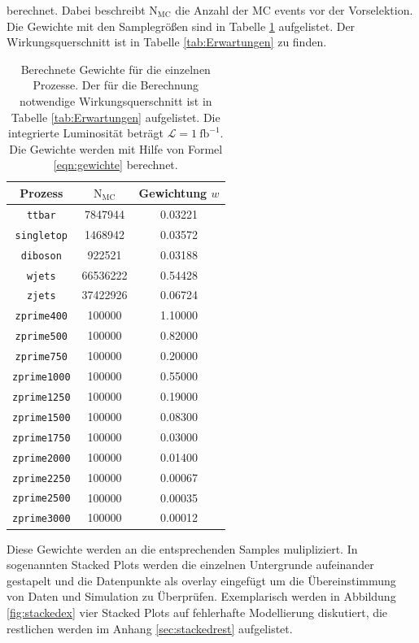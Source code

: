 berechnet. Dabei beschreibt $\text{N}_\text{MC}$ die Anzahl der MC events vor der
Vorselektion. Die Gewichte mit den Samplegrößen sind in Tabelle
\ref{tab:Gewichte} aufgelistet. Der Wirkungsquerschnitt ist in Tabelle
\ref{tab:Erwartungen} zu finden.

\begin{table}[H]
    \centering
    \caption{Berechnete Gewichte für die einzelnen Prozesse. Der für die Berechnung notwendige
    Wirkungsquerschnitt ist in Tabelle \ref{tab:Erwartungen} aufgelistet. Die integrierte
    Luminosität beträgt $\mathcal{L} = \SI{1}{\femto\barn}^{-1}$. Die Gewichte werden mit
    Hilfe von Formel \eqref{eqn:gewichte} berechnet.}
    \label{tab:Gewichte}
    \begin{tabular}{c|cc}
    \toprule
    Prozess & $\text{N}_\text{MC}$ & Gewichtung $w$ \\
    \midrule
    \texttt{ttbar}      & 7847944    & 0.03221     \\
    \texttt{singletop}  & 1468942    & 0.03572     \\
    \texttt{diboson}    & 922521     & 0.03188     \\
    \texttt{wjets}      & 66536222   & 0.54428     \\
    \texttt{zjets}      & 37422926   & 0.06724     \\
    \texttt{zprime400}  & 100000     & 1.10000     \\
    \texttt{zprime500}  & 100000     & 0.82000     \\
    \texttt{zprime750}  & 100000     & 0.20000     \\
    \texttt{zprime1000} & 100000     & 0.55000     \\
    \texttt{zprime1250} & 100000     & 0.19000     \\
    \texttt{zprime1500} & 100000     & 0.08300     \\
    \texttt{zprime1750} & 100000     & 0.03000     \\
    \texttt{zprime2000} & 100000     & 0.01400     \\
    \texttt{zprime2250} & 100000     & 0.00067     \\
    \texttt{zprime2500} & 100000     & 0.00035     \\
    \texttt{zprime3000} & 100000     & 0.00012     \\
    \bottomrule
    \end{tabular}
\end{table}

Diese Gewichte werden an die entsprechenden Samples mulipliziert. In sogenannten
Stacked Plots werden die einzelnen Untergrunde aufeinander gestapelt und
die Datenpunkte als overlay eingefügt um die Übereinstimmung von Daten und
Simulation zu Überprüfen. Exemplarisch werden in
Abbildung \ref{fig:stackedex} vier Stacked Plots auf
fehlerhafte Modellierung diskutiert, die restlichen werden im Anhang \ref{sec:stackedrest} aufgelistet.

